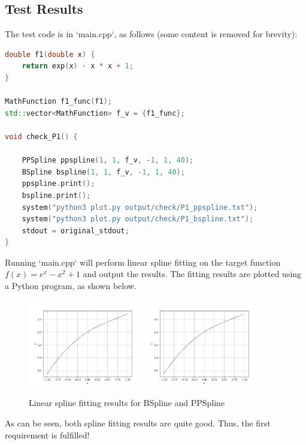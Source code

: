 \documentclass[a4paper]{article}
\begin{document}
\subsection{Test Results}
The test code is in `main.cpp`, as follows (some content is removed for brevity):
\begin{lstlisting}[language=C++]
double f1(double x) {
    return exp(x) - x * x + 1;
}

MathFunction f1_func(f1);
std::vector<MathFunction> f_v = {f1_func};

void check_P1() {
    
    PPSpline ppspline(1, 1, f_v, -1, 1, 40);
    BSpline bspline(1, 1, f_v, -1, 1, 40);
    ppspline.print();
    bspline.print();
    system("python3 plot.py output/check/P1_ppspline.txt");
    system("python3 plot.py output/check/P1_bspline.txt");
    stdout = original_stdout;
}
\end{lstlisting}
Running `main.cpp` will perform linear spline fitting on the target function \( f(x) = e^x - x^2 + 1 \) and output the results. The fitting results are plotted using a Python program, as shown below.
\begin{figure}[H]
    \centering
    \includegraphics[width=0.45\textwidth]{./figure/check/P1_bspline.png}
    \includegraphics[width=0.45\textwidth]{./figure/check/P1_ppspline.png}
    \caption{Linear spline fitting results for BSpline and PPSpline}
\end{figure}

As can be seen, both spline fitting results are quite good. Thus, the first requirement is fulfilled!
\end{document}
